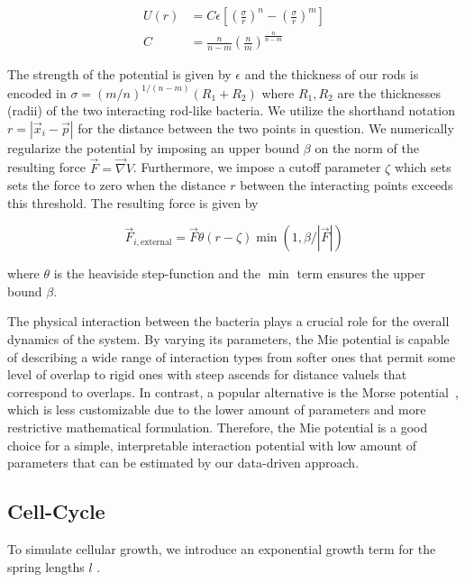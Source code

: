 \documentclass[10pt,letterpaper]{article}
\begin{document}
\begin{align}
    U(r) &= C\epsilon\left[ \left(\frac{\sigma}{r}\right)^n -
        \left(\frac{\sigma}{r}\right)^m\right]\\
    C &= \frac{n}{n-m}\left(\frac{n}{m}\right)^{\frac{n}{n-m}}
\end{align}

The strength of the potential is given by $\epsilon$ and the thickness of our rods
is encoded in $\sigma = (m/n)^{1/(n-m)}(R_1+R_2)$ where $R_1,R_2$ are the thicknesses (radii) of the
two interacting rod-like bacteria.
We utilize the shorthand notation $r=|\vec{x}_i - \vec{p}|$ for the distance between the two points
in question.
We numerically regularize the potential by imposing an upper bound $\beta$ on the norm of the
resulting force $\vec{F} = \vec{\nabla} V$.
Furthermore, we impose a cutoff parameter $\zeta$ which sets sets the force to zero when the
distance $r$ between the interacting points exceeds this threshold.
The resulting force is given by

\begin{equation}
    \vec{F}_{i,\text{external}} = \vec{F} \theta(r-\zeta) \min\left(1, \beta / |\vec{F}|\right)
\end{equation}

where $\theta$ is the heaviside step-function and the $\min$ term ensures the upper bound $\beta$.

The physical interaction between the bacteria plays a crucial role for the overall dynamics of the
system.
By varying its parameters, the Mie potential is capable of describing a wide range of interaction
types from softer ones that permit some level of overlap to rigid ones with steep ascends for
distance valuels that correspond to overlaps.
In contrast, a popular alternative is the Morse potential~\cite{Morse1929}, which is less
customizable due to the lower amount of parameters and more restrictive mathematical formulation.
Therefore, the Mie potential is a good choice for a simple, interpretable interaction potential with
low amount of parameters that can be estimated by our data-driven approach.

\subsection{Cell-Cycle}

To simulate cellular growth, we introduce an exponential growth term for the spring lengths $l$
\cite{Takeuchi2005}.
\end{document}
